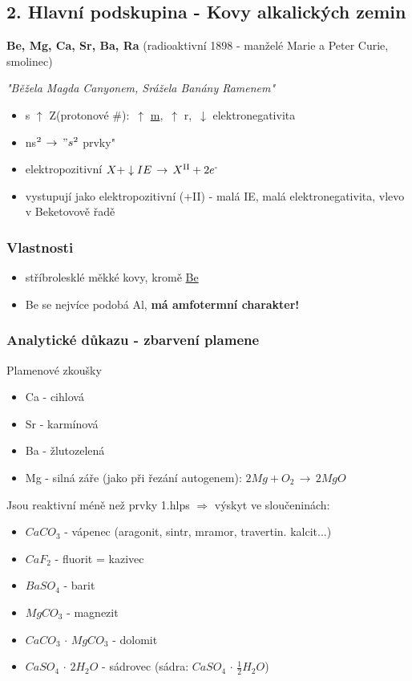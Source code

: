 \documentclass{article}
\def\SP#1{\textsuperscript{#1}}
\def\WATER{H_2O}
\begin{document}
\newpage
\subsection{2. Hlavní podskupina - Kovy alkalických zemin}
    \textbf{Be, Mg, Ca, Sr, Ba, Ra} (radioaktivní 1898 - manželé Marie a Peter Curie, smolinec)

    \textit{"Běžela Magda Canyonem, Srážela Banány Ramenem"}

    \begin{itemize}
        \item s $\uparrow$ Z(protonové \#): $\,\uparrow$ \underline{m}, $\,\uparrow$ r, $\,\downarrow$ elektronegativita
        \item ns$\SP{2}$ \fbox{$\uparrow \downarrow$} $\rightarrow \," s\SP{2}$ prvky"
        \item elektropozitivní \(X + \downarrow IE \,\to\,X\SP{II} + 2e\SP{-}\)
        \item vystupují jako elektropozitivní (+II) - malá IE, malá elektronegativita, vlevo v Beketovově řadě
    \end{itemize}

    \subsubsection{Vlastnosti}
        \begin{itemize}
            \item stříbrolesklé měkké kovy, kromě \underline{Be}
            \item Be se nejvíce podobá Al, \textbf{má amfotermní charakter!}
        \end{itemize}

    \subsubsection{Analytické důkazu - zbarvení plamene}
        Plamenové zkoušky
        \begin{itemize}
            \item Ca - cihlová
            \item Sr - karmínová
            \item Ba - žlutozelená
            \item Mg - silná záře (jako při řezání autogenem):  $2Mg + O _2 \,\to\, 2MgO$
        \end{itemize}
    Jsou reaktivní méně než prvky 1.hlps $\Rightarrow$ výskyt ve sloučeninách:
        \begin{itemize}
            \item $CaCO_3$ - vápenec (aragonit, sintr, mramor, travertin. kalcit...)
            \item $CaF_2$ - fluorit = kazivec
            \item $BaSO _4$ - barit
            \item $MgCO_3$ - magnezit
            \item $CaCO_3 \, \cdot \, MgCO_3$ - dolomit
            \item $CaSO_4 \, \cdot \, 2\WATER$ - sádrovec (sádra: $CaSO_4 \,\cdot\, \frac{1}{2}\WATER$)
        \end{itemize}
\end{document}
